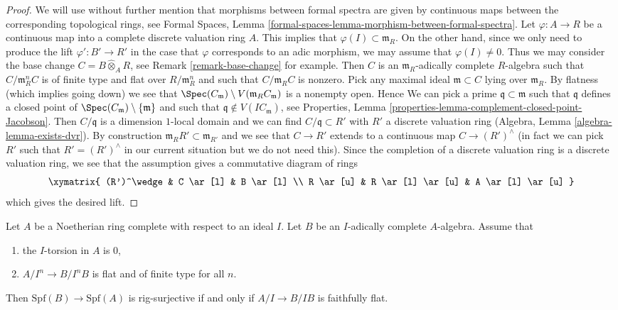 \begin{proof}
We will use without further mention that morphisms between formal spectra
are given by continuous maps between the corresponding topological rings, see
Formal Spaces, Lemma \ref{formal-spaces-lemma-morphism-between-formal-spectra}.
Let $\varphi : A \to R$ be a continuous map into a complete discrete
valuation ring $A$. This implies that $\varphi(I) \subset \mathfrak m_R$.
On the other hand, since we only need to produce the lift
$\varphi' : B' \to R'$ in the case that $\varphi$ corresponds to an adic
morphism, we may assume that $\varphi(I) \not = 0$. Thus we may consider
the base change $C = B \widehat{\otimes}_A R$, see
Remark \ref{remark-base-change} for example.
Then $C$ is an $\mathfrak m_R$-adically complete $R$-algebra
such that $C/\mathfrak m_R^n C$ is of finite type and flat over
$R/\mathfrak m_R^n$ and such that $C/\mathfrak m_R C$ is nonzero.
Pick any maximal ideal $\mathfrak m \subset C$ lying over
$\mathfrak m_R$. By flatness (which implies going down) we see that
$\Spec(C_\mathfrak m) \setminus V(\mathfrak m_R C_\mathfrak m)$
is a nonempty open. Hence
We can pick a prime $\mathfrak q \subset \mathfrak m$
such that $\mathfrak q$ defines a closed point of
$\Spec(C_\mathfrak m) \setminus \{\mathfrak m\}$ and such that
$\mathfrak q \not \in V(IC_\mathfrak m)$, see
Properties, Lemma \ref{properties-lemma-complement-closed-point-Jacobson}.
Then $C/\mathfrak q$ is a dimension $1$-local domain and we can find
$C/\mathfrak q \subset R'$ with $R'$ a discrete valuation ring
(Algebra, Lemma \ref{algebra-lemma-exists-dvr}).
By construction $\mathfrak m_R R' \subset \mathfrak m_{R'}$
and we see that $C \to R'$ extends to a continuous map
$C \to (R')^\wedge$ (in fact we can pick $R'$ such that
$R' = (R')^\wedge$ in our current situation but we do not need this).
Since the completion of a discrete valuation ring is a discrete
valuation ring, we see that the assumption gives a commutative
diagram of rings
$$
\xymatrix{
(R')^\wedge & C \ar[l] & B \ar[l] \\
R \ar[u] & R \ar[l] \ar[u] & A \ar[l] \ar[u]
}
$$
which gives the desired lift.
\end{proof}

\begin{lemma}
\label{lemma-flat-rig-surjective}
Let $A$ be a Noetherian ring complete with respect to an ideal $I$.
Let $B$ be an $I$-adically complete $A$-algebra. Assume that
\begin{enumerate}
\item the $I$-torsion in $A$ is $0$,
\item $A/I^n \to B/I^nB$ is flat and of finite type for all $n$.
\end{enumerate}
Then $\text{Spf}(B) \to \text{Spf}(A)$ is rig-surjective if and only
if $A/I \to B/IB$ is faithfully flat.
\end{lemma}

